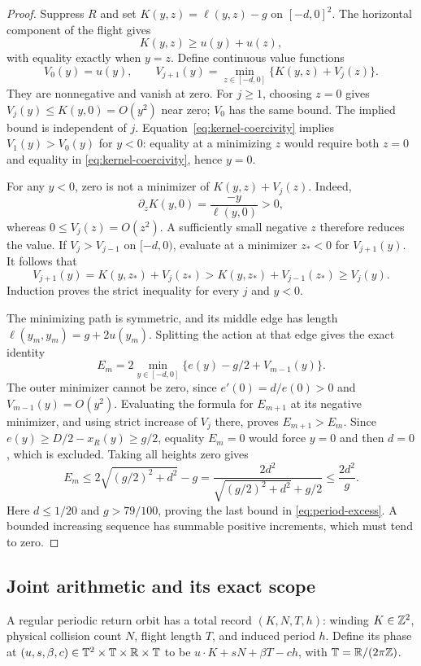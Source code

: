 \begin{proof}
Suppress $R$ and set $K(y,z)=\ell(y,z)-g$ on $[-d,0]^2$.
The horizontal component of the flight gives
\begin{equation}\label{eq:kernel-coercivity}
 K(y,z)\ge u(y)+u(z),
\end{equation}
with equality exactly when $y=z$. Define continuous value functions
\[
 V_0(y)=u(y),\qquad
 V_{j+1}(y)=\min_{z\in[-d,0]}\{K(y,z)+V_j(z)\}.
\]
They are nonnegative and vanish at zero. For $j\ge1$, choosing
$z=0$ gives $V_j(y)\le K(y,0)=O(y^2)$ near zero; $V_0$ has the
same bound. The implied bound is independent of $j$.
Equation~\eqref{eq:kernel-coercivity} implies $V_1(y)>V_0(y)$ for
$y<0$: equality at a minimizing $z$ would require both $z=0$ and
equality in \eqref{eq:kernel-coercivity}, hence $y=0$.

For any $y<0$, zero is not a minimizer of $K(y,z)+V_j(z)$. Indeed,
\[
 \partial_zK(y,0)=\frac{-y}{\ell(y,0)}>0,
\]
whereas $0\le V_j(z)=O(z^2)$. A sufficiently small negative $z$
therefore reduces the value. If $V_j>V_{j-1}$ on $[-d,0)$, evaluate
at a minimizer $z_*<0$ for $V_{j+1}(y)$. It follows that
\[
 V_{j+1}(y)=K(y,z_*)+V_j(z_*)
   >K(y,z_*)+V_{j-1}(z_*)\ge V_j(y).
\]
Induction proves the strict inequality for every $j$ and $y<0$.

The minimizing path is symmetric, and its middle edge has length
$\ell(y_m,y_m)=g+2u(y_m)$. Splitting the action at that edge gives
the exact identity
\begin{equation}\label{eq:bellman-excess}
 E_m=2\min_{y\in[-d,0]}\{e(y)-g/2+V_{m-1}(y)\}.
\end{equation}
The outer minimizer cannot be zero, since $e'(0)=d/e(0)>0$ and
$V_{m-1}(y)=O(y^2)$. Evaluating the formula for $E_{m+1}$ at its
negative minimizer, and using strict increase of $V_j$ there, proves
$E_{m+1}>E_m$. Since $e(y)\ge D/2-x_R(y)\ge g/2$, equality
$E_m=0$ would force $y=0$ and then $d=0$, which is excluded.
Taking all heights zero gives
\[
 E_m\le2\sqrt{(g/2)^2+d^2}-g
      =\frac{2d^2}{\sqrt{(g/2)^2+d^2}+g/2}\le\frac{2d^2}{g}.
\]
Here $d\le1/20$ and $g>79/100$, proving the last bound in
\eqref{eq:period-excess}. A bounded increasing sequence has summable
positive increments, which must tend to zero.
\end{proof}

\subsection{Joint arithmetic and its exact scope}
A regular periodic return orbit has a total record $(K,N,T,h)$:
winding $K\in\mathbb Z^2$, physical collision count $N$, flight length $T$,
and induced period $h$. Define its phase at
$(u,s,\beta,c)\in\mathbb T^2\times\mathbb T\times\mathbb R\times\mathbb T$ to be
$u\cdot K+sN+\beta T-ch$, with $\mathbb T=\mathbb R/(2\pi\mathbb Z)$.

